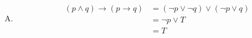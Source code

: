 {{\begin{practices}
\begin{enumerate}[A.]
{\begin{align*}
                        &= T
                    \end{align*}
                }
                \item
                {
                    \begin{align*}
                        (p \wedge q) \rightarrow (p \rightarrow q) &= (\neg p \vee \neg q) \vee (\neg p \vee q) \\
                        &= \neg p \vee T \\
                        &= T
                    \end{align*}
                }
            \end{enumerate}
        \end{practices}
    }
}
